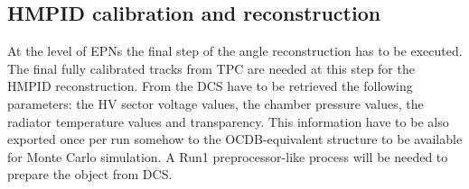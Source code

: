 \subsection{HMPID calibration and reconstruction}
\label{HMPID:EPN}

At the level of EPNs the final step of the angle reconstruction has to be executed. The final fully calibrated tracks from TPC are needed at this step for the HMPID reconstruction.
From the DCS have to be retrieved the following parameters: the HV sector voltage values, the chamber pressure values, the radiator temperature values and transparency. 
This information have to be also exported once per run somehow to the OCDB-equivalent structure to be
available for Monte Carlo simulation. A Run1 preprocessor-like process will be needed to prepare the object from DCS. 
 
